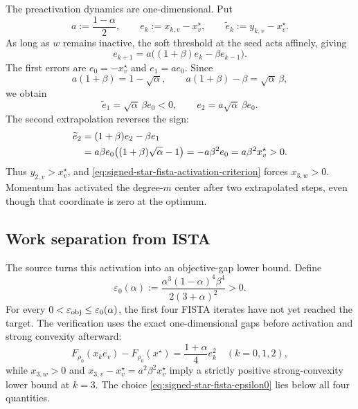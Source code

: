 The preactivation dynamics are one-dimensional.  Put
\begin{equation}
  a:=\frac{1-\alpha}{2},
  \qquad
  e_k:=x_{k,v}-x_v^\star,
  \qquad
  \widetilde e_k:=y_{k,v}-x_v^\star.
  \label{eq:signed-star-fista-errors}
\end{equation}
As long as $w$ remains inactive, the soft threshold at the seed acts
affinely, giving
\begin{equation}
  e_{k+1}=a\bigl((1+\beta)e_k-\beta e_{k-1}\bigr).
  \label{eq:signed-star-fista-scalar-recurrence}
\end{equation}
The first errors are $e_0=-x_v^\star$ and $e_1=ae_0$.  Since
\begin{equation}
  a(1+\beta)=1-\sqrt\alpha,
  \qquad
  a(1+\beta)-\beta=\sqrt\alpha\,\beta,
  \label{eq:signed-star-fista-parameter-identities}
\end{equation}
we obtain
\begin{equation}
  \widetilde e_1=\sqrt\alpha\,\beta e_0<0,
  \qquad
  e_2=a\sqrt\alpha\,\beta e_0.
  \label{eq:signed-star-fista-first-errors}
\end{equation}
The second extrapolation reverses the sign:
\begin{align}
  \widetilde e_2
  &=(1+\beta)e_2-\beta e_1 \notag\\
  &=a\beta e_0\bigl((1+\beta)\sqrt\alpha-1\bigr)
    =-a\beta^2e_0
    =a\beta^2x_v^\star>0.
  \label{eq:signed-star-fista-exact-overshoot}
\end{align}
Thus $y_{2,v}>x_v^\star$, and
\eqref{eq:signed-star-fista-activation-criterion} forces
$x_{3,w}>0$.  Momentum has activated the degree-$m$ center after two
extrapolated steps, even though that coordinate is zero at the optimum.

\subsection{Work separation from ISTA}

The source turns this activation into an objective-gap lower bound.  Define
\begin{equation}
  \varepsilon_0(\alpha)
  :=\frac{\alpha^3(1-\alpha)^4\beta^4}
          {2(3+\alpha)^2}>0.
  \label{eq:signed-star-fista-epsilon0}
\end{equation}
For every
$0<\varepsilon_{\rm obj}\le\varepsilon_0(\alpha)$, the first four FISTA
iterates have not yet reached the target.  The verification uses the exact
one-dimensional gaps before activation and strong convexity afterward:
\begin{equation}
  F_{\rho_0}(x_ke_v)-F_{\rho_0}(x^\star)
  =\frac{1+\alpha}{4}e_k^2
  \quad(k=0,1,2),
  \label{eq:signed-star-fista-preactivation-gap}
\end{equation}
while $x_{3,w}>0$ and
$x_{3,v}-x_v^\star=a^2\beta^2x_v^\star$ imply a strictly positive
strong-convexity lower bound at $k=3$.  The choice
\eqref{eq:signed-star-fista-epsilon0} lies below all four quantities.

